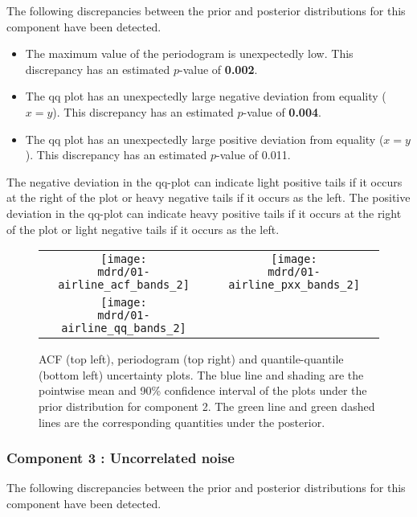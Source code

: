 \documentclass{article} %
\begin{document}
The following discrepancies between the prior and posterior distributions for this component have been detected.

\begin{itemize}

    \item The maximum value of the periodogram is unexpectedly low. This discrepancy has an estimated $p$-value of \textbf{0.002}.
    \item The qq plot has an unexpectedly large negative deviation from equality ($x = y$). This discrepancy has an estimated $p$-value of \textbf{0.004}.
    \item The qq plot has an unexpectedly large positive deviation from equality ($x = y$). This discrepancy has an estimated $p$-value of 0.011.
\end{itemize}

The negative deviation in the qq-plot can indicate light positive tails if it occurs at the right of the plot or heavy negative tails if it occurs as the left.
The positive deviation in the qq-plot can indicate heavy positive tails if it occurs at the right of the plot or light negative tails if it occurs as the left.


\begin{figure}[H]
\newcommand{\wmgd}{0.5\columnwidth}
\newcommand{\hmgd}{3.0cm}
\newcommand{\mdrd}{01-airline}
\newcommand{\mbm}{\hspace{-0.3cm}}
\begin{tabular}{cc}
\mbm \texttt{[image: \\mdrd/01-airline\_acf\_bands\_2]} & \texttt{[image: \\mdrd/01-airline\_pxx\_bands\_2]} \\
\mbm \texttt{[image: \\mdrd/01-airline\_qq\_bands\_2]}
\end{tabular}
\caption{
ACF (top left), periodogram (top right) and quantile-quantile (bottom left) uncertainty plots.
The blue line and shading are the pointwise mean and 90\% confidence interval of the plots under the prior distribution for component 2.
The green line and green dashed lines are the corresponding quantities under the posterior.}
\label{fig:check2}
\end{figure}

\subsubsection{Component 3 : Uncorrelated noise}


The following discrepancies between the prior and posterior distributions for this component have been detected.
\end{document}
